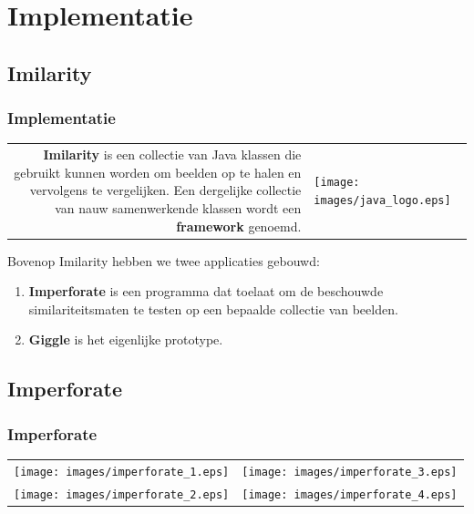 \documentclass[dutch]{beamer}
\theoremstyle{definition}
\theoremstyle{remark}
\theoremstyle{example}
\begin{document}
\section{Implementatie}
\subsection{Imilarity}
\frame
{
  \frametitle{Implementatie}
  
  \begin{center}
  \begin{tabular}{@{}rl@{}}
  \begin{minipage}{0.8\textwidth}
  \raggedright
  \textbf{Imilarity} is een collectie van Java klassen die gebruikt kunnen worden om 
  beelden op te halen en vervolgens te vergelijken. Een dergelijke collectie van nauw 
  samenwerkende klassen wordt een \textbf{framework} genoemd. 
  \end{minipage} &
  \begin{minipage}{0.2\textwidth}
  \centering
  \texttt{[image: images/java\_logo.eps]}
  \end{minipage}
  \end{tabular}
  \end{center}
  
  Bovenop Imilarity hebben we twee applicaties gebouwd:
  \begin{enumerate}
    \item \textbf{Imperforate} is een programma dat toelaat om de beschouwde 
    similariteitsmaten te testen op een bepaalde collectie van beelden.
    \item \textbf{Giggle} is het eigenlijke prototype.
  \end{enumerate}
}
\subsection{Imperforate}
\frame
{
  \frametitle{Imperforate}
  
  \centering
  \begin{tabular}{@{}rl@{}}
  \texttt{[image: images/imperforate\_1.eps]} &
  \texttt{[image: images/imperforate\_3.eps]} \vspace{8pt}\\
  \texttt{[image: images/imperforate\_2.eps]} &
  \texttt{[image: images/imperforate\_4.eps]}
  \end{tabular}
}
\end{document}
